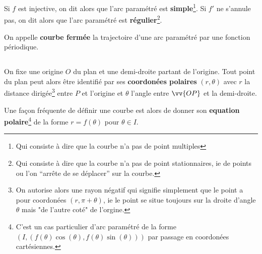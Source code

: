 Si \(f\) est injective, on dit alors que l'arc paramétré est \textbf{simple}\footnote[1]{Qui consiste à dire que la courbe n'a pas de point multiples}. \+
Si \(f'\) ne s'annule pas, on dit alors que l'arc paramétré est \textbf{régulier}\footnote[2]{Qui consiste à dire que la courbe n'a pas de point stationnaires, ie de points ou l'on ``arrête de se déplacer'' sur la courbe.}. \+

On appelle \textbf{courbe fermée} la trajectoire d'une arc paramétré par une fonction périodique.

\subsection*{}
On fixe une origine \(O\) du plan et une demi-droite partant de l'origine.
Tout point du plan peut alors être identifié par ses \textbf{coordonées polaires} \((r, \theta)\) avec \(r\) la distance dirigée\footnote[3]{ On autorise alors une rayon négatif qui signifie simplement que le point a pour coordonées \((r, \pi + \theta)\), ie le point se situe toujours sur la droite d'angle \(\theta\) mais "de l'autre coté" de l'orgine.} entre \(P\) et l'origine et \(\theta\) l'angle entre \(\vv{OP}\) et la demi-droite.\<

Une façon fréquente de définir une courbe est alors de donner son \textbf{equation polaire}\footnote[4]{C'est un cas particulier d'arc paramétré de la forme \((I, (f(\theta)\cos(\theta), f(\theta)\sin(\theta)))\) par passage en coordonées cartésiennes.} de la forme \(r = f(\theta)\) pour \(\theta \in I\). 
\pagebreak

